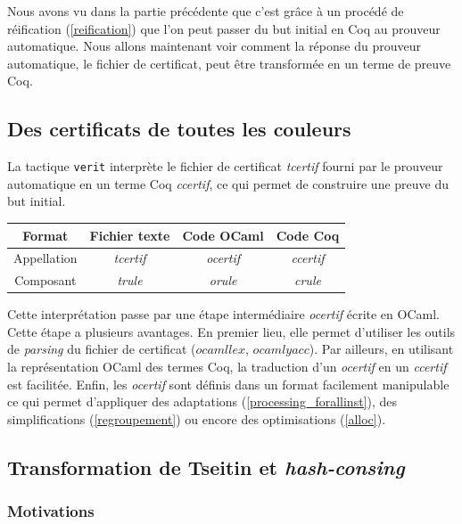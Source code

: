 \documentclass[11pt]{article}
\begin{document}
Nous avons vu dans la partie précédente que c'est grâce à un procédé de réification (\ref{reification}) que l'on peut passer du but initial en Coq au prouveur automatique. Nous allons maintenant voir comment la réponse du prouveur automatique, le fichier de certificat, peut être transformée en un terme de preuve Coq.

\subsection{Des certificats de toutes les couleurs} \label{des_certificats}

La tactique \texttt{verit} interprète le fichier de certificat \textit{tcertif} fourni par le prouveur automatique en un terme Coq \textit{ccertif}, ce qui permet de construire une preuve du but initial. 

\begin{center}
\begin{tabular}{ |c||c|c|c| } 
 \hline
 Format & Fichier texte & Code OCaml & Code Coq \\ 
 \hline
 Appellation & \textit{tcertif} & \textit{ocertif} & \textit{ccertif} \\ 
 \hline
 Composant & \textit{trule} & \textit{orule} & \textit{crule} \\ 
 \hline
\end{tabular}
\end{center}

Cette interprétation passe par une étape intermédiaire \textit{ocertif} écrite en OCaml. Cette étape a plusieurs avantages. En premier lieu, elle permet d'utiliser les outils de \textit{parsing} du fichier de certificat ($ocamllex$, $ocamlyacc$). Par ailleurs, en utilisant la représentation OCaml des termes Coq, la traduction d'un \textit{ocertif} en un \textit{ccertif} est facilitée. Enfin, les \textit{ocertif} sont définis dans un format facilement manipulable ce qui permet d'appliquer des adaptations (\ref{processing_forallinst}), des simplifications (\ref{regroupement}) ou encore des optimisations (\ref{alloc}).

\subsection{Transformation de Tseitin et \textit{hash-consing}} \label{tseitin}

\subsubsection{Motivations}
\end{document}

